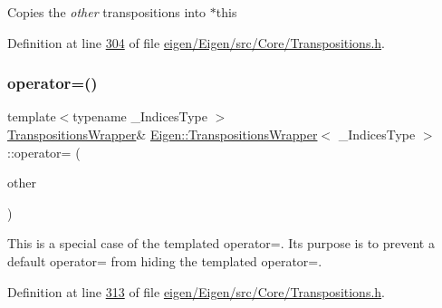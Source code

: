 Copies the {\itshape other} transpositions into {\ttfamily $\ast$this} 

Definition at line \hyperlink{eigen_2_eigen_2src_2_core_2_transpositions_8h_source_l00304}{304} of file \hyperlink{eigen_2_eigen_2src_2_core_2_transpositions_8h_source}{eigen/\+Eigen/src/\+Core/\+Transpositions.\+h}.

\mbox{\label{class_eigen_1_1_transpositions_wrapper_acb74132efbe10876525cdc3d35c2d382}} 
\subsubsection{\texorpdfstring{operator=()}{operator=()}\hspace{0.1cm}{\footnotesize\ttfamily [3/4]}}
{\footnotesize\ttfamily template$<$typename \+\_\+\+Indices\+Type $>$ \\
\hyperlink{class_eigen_1_1_transpositions_wrapper}{Transpositions\+Wrapper}\& \hyperlink{class_eigen_1_1_transpositions_wrapper}{Eigen\+::\+Transpositions\+Wrapper}$<$ \+\_\+\+Indices\+Type $>$\+::operator= (\begin{DoxyParamCaption}\item[{const \hyperlink{class_eigen_1_1_transpositions_wrapper}{Transpositions\+Wrapper}$<$ \+\_\+\+Indices\+Type $>$ \&}]{other }\end{DoxyParamCaption})\hspace{0.3cm}{\ttfamily [inline]}}

This is a special case of the templated operator=. Its purpose is to prevent a default operator= from hiding the templated operator=. 

Definition at line \hyperlink{eigen_2_eigen_2src_2_core_2_transpositions_8h_source_l00313}{313} of file \hyperlink{eigen_2_eigen_2src_2_core_2_transpositions_8h_source}{eigen/\+Eigen/src/\+Core/\+Transpositions.\+h}.

\mbox{\label{class_eigen_1_1_transpositions_wrapper_acb74132efbe10876525cdc3d35c2d382}} 
